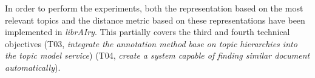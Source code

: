 In order to perform the experiments, both the representation based on the most relevant topics and the distance metric based on these representations have been implemented in \textit{librAIry}. This partially covers the third and fourth technical objectives (T03, \textit{integrate the annotation method base on topic hierarchies into the topic model service}) (T04, \textit{create a system capable of finding similar document automatically}).